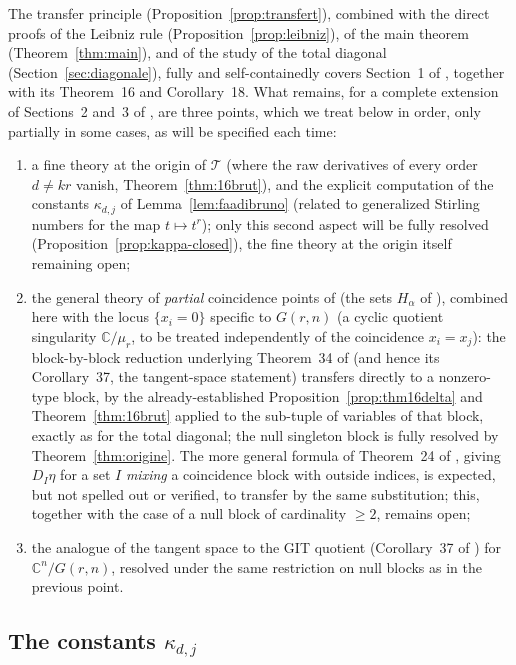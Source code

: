 \documentclass[11pt]{article}
\theoremstyle{remark}
\newcommand{\CC}{\mathbb{C}}
\begin{document}
The transfer principle (Proposition~\ref{prop:transfert}), combined with the direct proofs of the Leibniz rule (Proposition~\ref{prop:leibniz}), of the main theorem (Theorem~\ref{thm:main}), and of the study of the total diagonal (Section~\ref{sec:diagonale}), fully and self-containedly covers Section~1 of \cite{Ze}, together with its Theorem~16 and Corollary~18. What remains, for a complete extension of Sections~2 and~3 of \cite{Ze}, are three points, which we treat below in order, only partially in some cases, as will be specified each time:
\begin{enumerate}
\item a fine theory at the origin of $\mathcal T$ (where the raw derivatives of every order $d\ne kr$ vanish, Theorem~\ref{thm:16brut}), and the explicit computation of the constants $\kappa_{d,j}$ of Lemma~\ref{lem:faadibruno} (related to generalized Stirling numbers for the map $t\mapsto t^r$); only this second aspect will be fully resolved (Proposition~\ref{prop:kappa-closed}), the fine theory at the origin itself remaining open;
\item the general theory of \emph{partial} coincidence points of \cite[Section~3]{Ze} (the sets $H_\alpha$ of \cite{Ze}), combined here with the locus $\{x_i=0\}$ specific to $G(r,n)$ (a cyclic quotient singularity $\CC/\mu_r$, to be treated independently of the coincidence $x_i=x_j$): the block-by-block reduction underlying Theorem~34 of \cite{Ze} (and hence its Corollary~37, the tangent-space statement) transfers directly to a nonzero-type block, by the already-established Proposition~\ref{prop:thm16delta} and Theorem~\ref{thm:16brut} applied to the sub-tuple of variables of that block, exactly as for the total diagonal; the null singleton block is fully resolved by Theorem~\ref{thm:origine}. The more general formula of Theorem~24 of \cite{Ze}, giving $D_I\eta$ for a set $I$ \emph{mixing} a coincidence block with outside indices, is expected, but not spelled out or verified, to transfer by the same substitution; this, together with the case of a null block of cardinality $\ge2$, remains open;
\item the analogue of the tangent space to the GIT quotient (Corollary~37 of \cite{Ze}) for $\CC^n/G(r,n)$, resolved under the same restriction on null blocks as in the previous point.
\end{enumerate}

\subsection{The constants $\kappa_{d,j}$}
\end{document}
